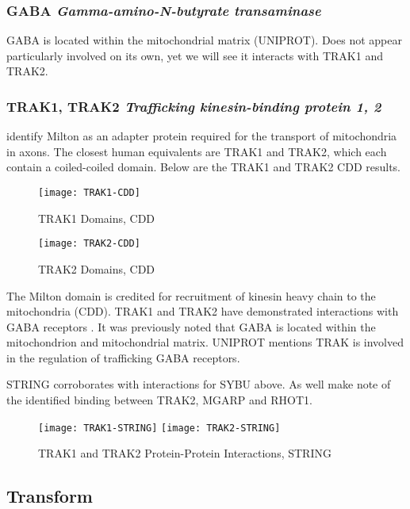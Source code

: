 \subsubsection{GABA \textit{Gamma-amino-N-butyrate transaminase}}

GABA is located within the mitochondrial matrix (UNIPROT). Does not appear
particularly involved on its own, yet we will see it interacts with TRAK1 and
TRAK2.

\subsubsection{TRAK1, TRAK2 \textit{Trafficking kinesin-binding protein 1, 2}}

\cite{Reis2009} identify Milton as an adapter protein required for the
transport of mitochondria in axons.  The closest human equivalents are TRAK1
and TRAK2, which each contain a coiled-coiled domain. Below are the TRAK1 and
TRAK2 CDD results.

\begin{figure}[h]
  \texttt{[image: TRAK1-CDD]}
  \caption{TRAK1 Domains, CDD}
\end{figure}

\begin{figure}[h]
  \texttt{[image: TRAK2-CDD]}
  \caption{TRAK2 Domains, CDD}
\end{figure}

The Milton domain is credited for recruitment of kinesin heavy chain to the
mitochondria (CDD). TRAK1 and TRAK2 have demonstrated interactions with
GABA receptors \citep{Resi2009}. It was previously noted that GABA is located
within the mitochondrion and mitochondrial matrix. UNIPROT mentions TRAK is
involved in the regulation of trafficking GABA receptors.

STRING corroborates with interactions for SYBU above. As well make note of the
identified binding between TRAK2, MGARP and RHOT1.

\begin{figure}[h]
  \texttt{[image: TRAK1-STRING]}
  \texttt{[image: TRAK2-STRING]}
  \caption{TRAK1 and TRAK2 Protein-Protein Interactions, STRING}
\end{figure}

\subsection{Transform}

